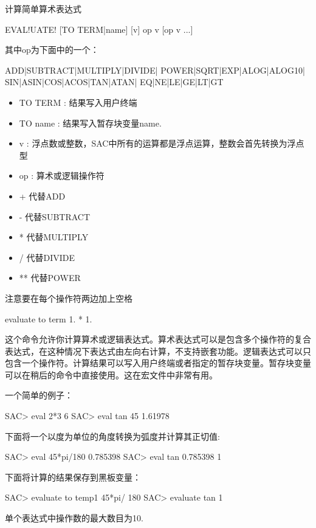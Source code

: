 \label{cmd:evaluate}

计算简单算术表达式

\begin{SACSTX}
EVAL!UATE! [TO TERM|name] [v] op v [op v ...]
\end{SACSTX}
其中op为下面中的一个：
\begin{SACSTX}
ADD|SUBTRACT|MULTIPLY|DIVIDE|
POWER|SQRT|EXP|ALOG|ALOG10|
SIN|ASIN|COS|ACOS|TAN|ATAN|
EQ|NE|LE|GE|LT|GT
\end{SACSTX}

\begin{itemize}
\item TO TERM : 结果写入用户终端
\item TO name : 结果写入暂存块变量name.
\item v : 浮点数或整数，SAC中所有的运算都是浮点运算，整数会首先转换为浮点型
\item op : 算术或逻辑操作符
\end{itemize}

\begin{itemize}
\item + 代替ADD
\item - 代替SUBTRACT
\item * 代替MULTIPLY
\item / 代替DIVIDE
\item ** 代替POWER
\end{itemize}
注意要在每个操作符两边加上空格

\begin{SACDFT}
evaluate to term 1. * 1.
\end{SACDFT}

这个命令允许你计算算术或逻辑表达式。算术表达式可以是包含多个操作符的复合表达式，在这种情况下表达式由左向右计算，不支持嵌套功能。逻辑表达式可以只包含一个操作符。计算结果可以写入用户终端或者指定的暂存块变量。暂存块变量可以在稍后的命令中直接使用。这在宏文件中非常有用。

一个简单的例子：
\begin{SACCode}
SAC> eval 2*3
 6
SAC> eval tan 45
1.61978
\end{SACCode}

下面将一个以度为单位的角度转换为弧度并计算其正切值:
\begin{SACCode}
SAC> eval 45*pi/180
 0.785398
SAC> eval tan 0.785398
 1
\end{SACCode}

下面将计算的结果保存到黑板变量：
\begin{SACCode}
SAC> evaluate to temp1 45*pi/ 180
SAC> evaluate tan %
 1
\end{SACCode}

单个表达式中操作数的最大数目为10.


